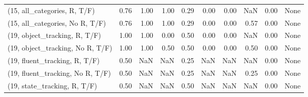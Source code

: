 \begin{table*}[h!]
\begin{adjustbox}{width=2\columnwidth,center}
\begin{tabular}{lrrr|rrr|rrr}
(15, all\_categories, R, T/F)          &                      0.76 &                  1.00 &                      1.00 &                          0.29 &                      0.00 &                          0.00 &                                    NaN &                               0.00 &                                  None \\
(15, all\_categories, No R, T/F)       &                      0.76 &                  1.00 &                      1.00 &                          0.29 &                      0.00 &                          0.00 &                                   0.57 &                               0.00 &                                  None \\



\midrule
(19, object\_tracking, R, T/F)         &                      1.00 &                  1.00 &                      0.00 &                          0.50 &                      0.00 &                          0.00 &                                    NaN &                               0.00 &                                  None \\
(19, object\_tracking, No R, T/F)      &                      1.00 &                  1.00 &                      0.50 &                          0.50 &                      0.00 &                          0.00 &                                   0.50 &                               0.00 &                                  None \\
(19, fluent\_tracking, R, T/F)         &                      0.50 &                   NaN &                       NaN &                          0.25 &                       NaN &                           NaN &                                    NaN &                               0.00 &                                  None \\
(19, fluent\_tracking, No R, T/F)      &                      0.50 &                   NaN &                       NaN &                          0.25 &                       NaN &                           NaN &                                   0.25 &                               0.00 &                                  None \\
(19, state\_tracking, R, T/F)          &                      0.50 &                   NaN &                       NaN &                          0.50 &                       NaN &                           NaN &                                    NaN &                               0.00 &                                  None \\

\end{tabular}
\end{adjustbox}
\end{table*}

